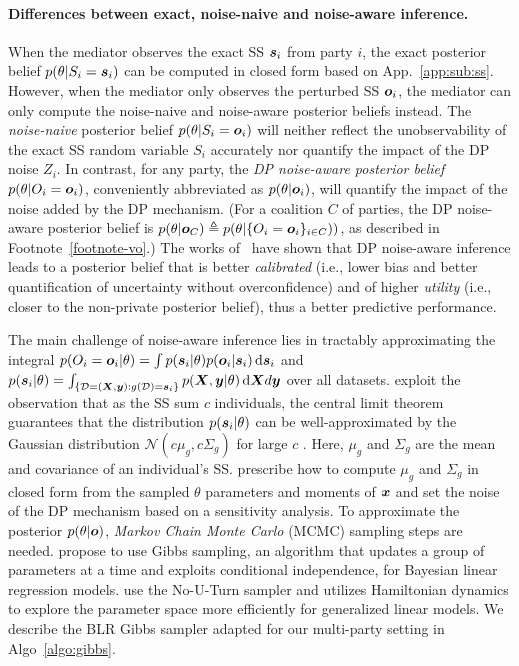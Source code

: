 \documentclass{article}
\theoremstyle{plain}
\theoremstyle{definition}
\theoremstyle{remark}
\renewcommand{\citet}[1]{\cite{#1}}
\begin{document}
\paragraph{Differences between exact, noise-naive and noise-aware inference.}
When the mediator observes the exact SS ${\bm{s}}_i$ from party $i$, the exact posterior belief $p(\theta|S_i = {\bm{s}}_i)$ can be computed in closed form based on App.~\ref{app:sub:ss}.
However, when the mediator only observes the perturbed SS ${\bm{o}}_i$, the mediator can only compute the noise-naive and noise-aware posterior beliefs instead.
The \emph{noise-naive} posterior belief $p(\theta|S_i = {\bm{o}}_i)$ will neither reflect the unobservability of the exact SS random variable $S_i$ accurately nor quantify the impact of the DP noise $Z_i$.
In contrast, for any party, the \emph{DP noise-aware posterior belief} $p(\theta|O_i = {\bm{o}}_i)$, conveniently abbreviated as $p(\theta|{\bm{o}}_i)$, will quantify the impact of the noise added by the DP mechanism. (For a coalition $C$ of parties, the DP noise-aware posterior belief is $p(\theta|{\bm{o}}_C) \triangleq p(\theta|\{O_i = {\bm{o}}_i\}_{i \in C}))$, as described in Footnote~\ref{footnote-vo}.)
The works of~\citet{bernstein2018expfam,bernstein2019blr,kulkarni2021glm} have shown that DP noise-aware inference leads to a posterior belief that is better \emph{calibrated} (i.e., lower bias and better quantification of uncertainty without overconfidence) and of higher \emph{utility} (i.e., closer to the non-private posterior belief), thus a better predictive performance.

The main challenge of noise-aware inference lies in tractably approximating the integral $p(O_i={\bm{o}}_i|\theta) = \int p({\bm{s}}_i|\theta)p({\bm{o}}_i|{\bm{s}}_i) \,\text{d}{\bm{s}}_i$ and $p({\bm{s}}_i|\theta) = \int_{\{ {\mathcal{D}}=({\bm{X}}, {\bm{y}}): g({\mathcal{D}}) = {\bm{s}}_i \}} p({\bm{X}}, {\bm{y}} | \theta)\, \text{d}{\bm{X}} d{\bm{y}}$ over all datasets.
\citet{bernstein2018expfam,bernstein2019blr,kulkarni2021glm} exploit the observation that as the SS sum $c$ individuals, the central limit theorem guarantees that the distribution $p({\bm{s}}_i|\theta)$ can be well-approximated by the Gaussian distribution $\mathcal{N}(c\mu_g, c\Sigma_g)$ for large $c$ \cite{bernstein2019blr}. Here, $\mu_g$ and $\Sigma_g$ are the mean and covariance of an individual's SS. \citet{bernstein2018expfam,bernstein2019blr,kulkarni2021glm,kulkarni2021locally} prescribe how to compute $\mu_g$ and $\Sigma_g$ in closed form from the sampled $\theta$ parameters and moments of ${\bm{x}}$ and set the noise of the DP mechanism based on a sensitivity analysis. 
To approximate the posterior $p(\theta|{\bm{o}})$, \emph{Markov Chain Monte Carlo} (MCMC) sampling steps are needed. \citet{bernstein2019blr} propose to use Gibbs sampling, an algorithm that updates a group of parameters at a time and exploits conditional independence, for Bayesian linear regression models. \citet{kulkarni2021glm} use the No-U-Turn \cite{hoffman2014no} sampler and utilizes Hamiltonian dynamics to explore the parameter space more efficiently for generalized linear models.
We describe the BLR Gibbs sampler adapted for our multi-party setting in Algo~\ref{algo:gibbs}.
\end{document}
